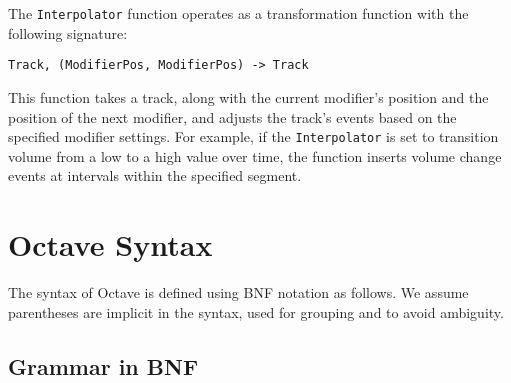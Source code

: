 \documentclass[letterpaper,12pt]{article}
\begin{document}
The \texttt{Interpolator} function operates as a transformation function with the following signature:

\begin{center}
\texttt{Track, (ModifierPos, ModifierPos) -> Track}
\end{center}

This function takes a track, along with the current modifier's position and the position of the next modifier, 
and adjusts the track's events based on the specified modifier settings. For example, if the \texttt{Interpolator} 
is set to transition volume from a low to a high value over time, the function inserts volume change events at 
intervals within the specified segment. 


\section{Octave Syntax}

The syntax of Octave is defined using BNF notation as follows. We assume parentheses are implicit in the syntax, used for grouping and to avoid ambiguity.

\subsection{Grammar in BNF}
\end{document}
